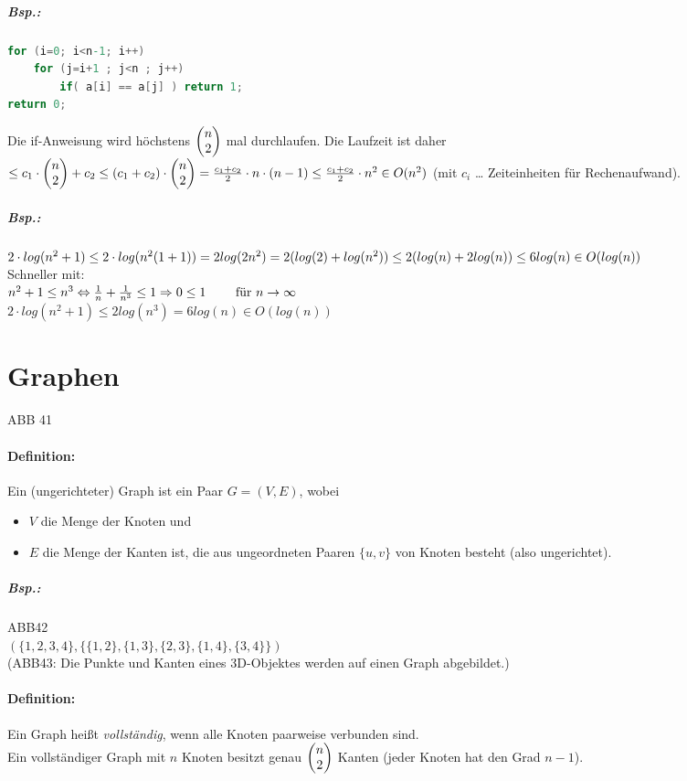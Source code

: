 \subparagraph{Bsp.:}
\begin{lstlisting}[language=C]
for (i=0; i<n-1; i++)
	for (j=i+1 ; j<n ; j++)
		if( a[i] == a[j] ) return 1;
return 0;
\end{lstlisting}
Die if-Anweisung wird höchstens $\begin{pmatrix}n\\2\end{pmatrix}$ mal durchlaufen. Die Laufzeit ist daher $\leq c_1 \cdot \begin{pmatrix}n\\2\end{pmatrix} + c_2 \leq (c_1+c_2) \cdot \begin{pmatrix}n\\2\end{pmatrix} = \frac{c_1+c_2}{2}\cdot n \cdot (n-1)\leq \frac{c_1 + c_2}{2}\cdot n^2 \in O(n^2)$ (mit $c_i$ … Zeiteinheiten für Rechenaufwand).
\subparagraph{Bsp.:} $2\cdot log(n^2+1)\\
\leq 2 \cdot log (n^2(1+1))\\
=2log(2n^2)=2(log(2)+log(n^2)) \\
\leq 2(log(n)+2log(n))\\
\leq 6 log(n) \in O(log(n))$\\
Schneller mit:\\
$n^2+1\leq n^3 \Leftrightarrow \\
\frac{1}{n}+\frac{1}{n^3}\leq 1 \Rightarrow \\
0\leq 1 \qquad \text{ für } n \rightarrow\infty$\\
$2\cdot log(n^2+1)\leq 2 log (n^3)=6log(n)\in O(log(n))$

\section{Graphen}

ABB 41
\paragraph{Definition:} Ein (ungerichteter) Graph ist ein Paar $G=(V,E)$, wobei
\begin{itemize}
\item $V$ die Menge der Knoten und
\item $E$ die Menge der Kanten ist, die aus ungeordneten Paaren $\{u,v\}$ von Knoten besteht (also ungerichtet).
\end{itemize}

\subparagraph{Bsp.:} \parskp
ABB42\\
$(\{1,2,3,4\},\{\{1,2\},\{1,3\}, \{2,3\}, \{1,4\}, \{3,4\}\})$\\
(ABB43: Die Punkte und Kanten eines 3D-Objektes werden auf einen Graph abgebildet.)

\paragraph{Definition:} Ein Graph heißt \emph{vollständig}, wenn alle Knoten paarweise verbunden sind. \bigskip\\
Ein vollständiger Graph mit $n$ Knoten besitzt genau $\begin{pmatrix}n\\2\end{pmatrix}$ Kanten (jeder Knoten hat den Grad $n-1$).

